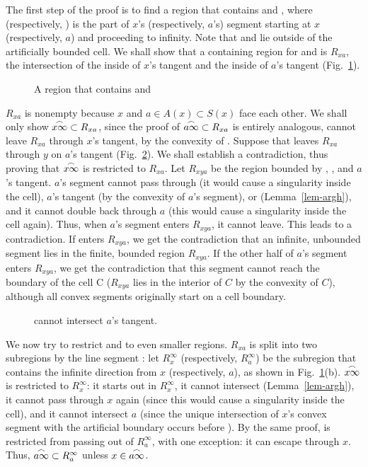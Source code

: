 The first step of the proof is to find a region that contains
 and , where  (respectively, 
) is the part of
$x$'s (respectively, $a$'s) segment starting at $x$ (respectively, $a$) and proceeding to infinity.
Note that  and  lie outside of the artificially bounded cell.
We shall show that a containing region for  and  is 
$R_{xa}$, the intersection of the inside of $x$'s tangent and the inside of $a$'s tangent 
(Fig.~\ref{fig-ax}).
%
\begin{figure}[tbp]\vspace{2in}\caption{A region that contains  and }\label{fig-ax}\end{figure}
%
$R_{xa}$ is nonempty because $x$ and $a \in A(x) \subset S(x)$ face each other.
We shall only show $\mbox{$\stackrel{\frown}{x\infty}$} \subset R_{xa}$, since the proof of 
$\mbox{$\stackrel{\frown}{a\infty}$} \subset R_{xa}$ is entirely analogous, 
 cannot leave $R_{xa}$ through $x$'s tangent, by the convexity of .
Suppose that  leaves $R_{xa}$ through
$y$ on $a$'s tangent (Fig.~\ref{fig.chick}).
We shall establish a contradiction, thus proving that $\mbox{$\stackrel{\frown}{x\infty}$}$ is restricted
to $R_{xa}$.
Let $R_{xya}$ be the region bounded by , , and $a$'s tangent.
$a$'s segment cannot pass through 
(it would cause a singularity inside the cell), $a$'s tangent (by 
the convexity of $a$'s segment), or  (Lemma~\ref{lem-argh}),
and it cannot double back through $a$
(this would cause a singularity inside the cell again).
Thus, when $a$'s segment enters $R_{xya}$, it cannot leave.
This leads to a contradiction.
If  enters $R_{xya}$, we get the contradiction that an infinite, 
unbounded segment lies in the finite, bounded region $R_{xya}$.
If the other half of $a$'s segment enters $R_{xya}$,
we get the contradiction that this segment cannot reach the boundary of the 
cell C ($R_{xya}$ lies in the interior of $C$ by the convexity of $C$), 
although all convex segments originally start on a cell boundary.

\begin{figure}[bp]\vspace{2in}\caption{ cannot intersect $a$'s tangent.}\label{fig.chick}\end{figure}

We now try to restrict  and  to even smaller regions.
$R_{xa}$ is split into two subregions by the line segment :
let $R_{x}^{\infty}$ (respectively, $R_{a}^{\infty}$) be the subregion that contains 
the infinite direction from $x$ (respectively, $a$), as shown in Fig.~\ref{fig-ax}(b).
$\mbox{$\stackrel{\frown}{x\infty}$}$ is restricted to $R_{x}^{\infty}$:
it starts out in $R_{x}^{\infty}$, it cannot intersect 
(Lemma~\ref{lem-argh}), 
it cannot pass through $x$ again (since this would cause
a singularity inside the cell),
and it cannot intersect $a$ (since the unique intersection of $x$'s convex segment 
with the artificial boundary occurs before ).
By the same proof,  is restricted from passing out of $R_{a}^{\infty}$,
with one exception: it can escape through $x$.
Thus, $\mbox{$\stackrel{\frown}{a\infty}$} \subset R_{a}^{\infty}$ unless $x \in \mbox{$\stackrel{\frown}{a\infty}$}$.

